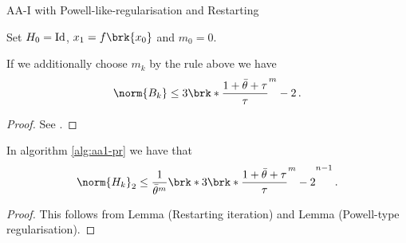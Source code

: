 \begin{frame}
	\begin{algorithm}[H]
	\caption{AA-I with Powell-like-regularisation and Restarting}\label{alg:aa1-pr}
	\color{gray}
	\BlankLine
	Set $H_0=\operatorname{Id}$, $x_1=f\brk{x_0}$ and {\color{black} $m_0 = 0$}.
	
	\end{algorithm}
\end{frame}

\begin{frame}
	\begin{lemma}
		If we additionally choose $m_k$ by the rule above we have
		\begin{align*}
			\norm{B_k}\leq 3\brk*{\frac{1+\bartheta+\tau}{\tau}}^m-2\,.
		\end{align*}
	\end{lemma}
	\begin{proof}
		See \cite[Lemma 3]{ZhaAA}.
	\end{proof}
\end{frame}

\begin{frame}
	\begin{lemma}
		In algorithm \ref{alg:aa1-pr} we have that
		\begin{align*}
			\norm{H_k}_2\leq \frac{1}{\bartheta^m}\brk*{3\brk*{\frac{1+\bartheta+\tau}{\tau}}^m-2}^{n-1}\,.
		\end{align*}
	\end{lemma}
	\begin{proof}
		This follows from Lemma (Restarting iteration) and Lemma (Powell-type regularisation).
	\end{proof}
\end{frame}

